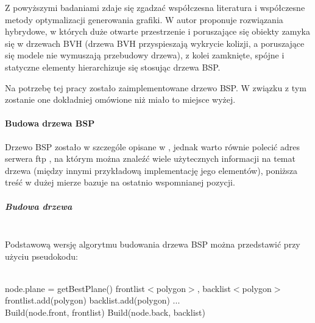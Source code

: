 Z powyższymi badaniami zdaje się zgadzać współczesna literatura i współczesne metody optymalizacji generowania grafiki. W \cite{trees} autor proponuje rozwiązania hybrydowe, w których duże otwarte przestrzenie i poruszające się obiekty zamyka się w drzewach BVH (drzewa BVH przyspieszają wykrycie kolizji, a poruszające się modele nie wymuszają przebudowy drzewa), z kolei zamknięte, spójne i statyczne elementy hierarchizuje się stosując drzewa BSP.

Na potrzebę tej pracy zostało zaimplementowane drzewo BSP. W związku z tym zostanie one dokładniej omówione niż miało to miejsce wyżej.

\paragraph{Budowa drzewa BSP}

Drzewo BSP zostało w szczególe opisane w \cite{trees}, jednak warto równie polecić adres serwera ftp \cite{bspfaq}, na którym można znaleźć wiele użytecznych informacji na temat drzewa (między innymi przykładową implementację jego elementów), poniższa treść w dużej mierze bazuje na ostatnio wspomnianej pozycji.

\subparagraph{Budowa drzewa}\mbox{} \\

Podstawową wersję algorytmu budowania drzewa BSP można przedstawić przy użyciu pseudokodu:

\begin{algorithm}
\begin{algorithmic}
\\
\State node.plane = getBestPlane()
\State frontlist$<$polygon$>$, backlist$<$polygon$>$
\\
    		frontlist.add(polygon)
     		backlist.add(polygon)
     \Else
     		...
     \EndIf
\EndFor
\\
\State Build(node.front, frontlist)
\State Build(node.back, backlist)
\\
\EndFunction
\end{algorithmic}
\end{algorithm}


